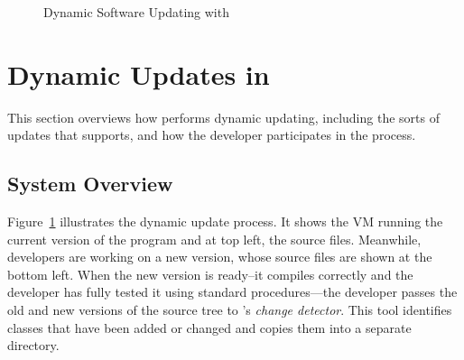 \begin{figure}[t]
\begin{center}
\end{center}
\caption{Dynamic Software Updating with \DSU}
\label{fig:overview}
\end{figure}



\section{Dynamic Updates in \DSU}

This section overviews how \DSU{} performs dynamic updating, including
the sorts of updates that \DSU{} supports, and how the developer
participates in the process.


\subsection{System Overview}

Figure~\ref{fig:overview} illustrates the dynamic update process.  It
shows the VM running the current version of the program and at top
left, the source files.  Meanwhile, developers are working on a new
version,
whose source files are shown at the
bottom left.  When the new version is ready--it compiles correctly and
the developer has fully tested it using standard procedures---the
developer passes the old and new versions of the source tree to \DSU's
\emph{change detector}.  This tool identifies classes that have
been added or changed and copies them into a separate directory.


